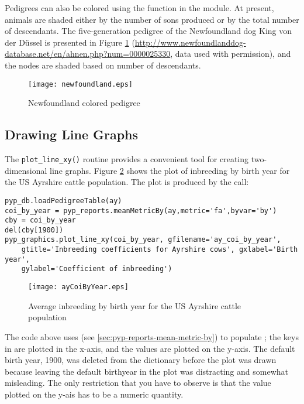 Pedigrees can also be colored using the  function in the  module. At present, animals are shaded either by the number of sons produced or by the total number of descendants. The five-generation pedigree of the Newfoundland dog King von der D\"{u}ssel is presented in Figure \ref{fig:newfoundland-colored-pedigree} (\url{http://www.newfoundlanddog-database.net/en/ahnen.php?num=0000025330}, data used with permission), and the nodes are shaded based on number of descendants.
\begin{figure}
  \begin{center}
    \texttt{[image: newfoundland.eps]}
    \caption{Newfoundland colored pedigree}
    \label{fig:newfoundland-colored-pedigree}
  \end{center}
\end{figure}

\subsection{Drawing Line Graphs}\label{sec:graphics-drawing-line-graphs}
The \texttt{plot\_line\_xy()} routine provides a convenient tool for creating two-dimensional line graphs.  Figure \ref{fig:ayrshire-coi-graph} shows the plot of inbreeding by birth year for the US Ayrshire cattle population.  The plot is produced by the call:
\begin{verbatim}
pyp_db.loadPedigreeTable(ay)
coi_by_year = pyp_reports.meanMetricBy(ay,metric='fa',byvar='by')
cby = coi_by_year
del(cby[1900])
pyp_graphics.plot_line_xy(coi_by_year, gfilename='ay_coi_by_year',
    gtitle='Inbreeding coefficients for Ayrshire cows', gxlabel='Birth year',
    gylabel='Coefficient of inbreeding')
\end{verbatim}
\begin{figure}
  \begin{center}
    \texttt{[image: ayCoiByYear.eps]}
    \caption{Average inbreeding by birth year for the US Ayrshire cattle population}
    \label{fig:ayrshire-coi-graph}
  \end{center}
\end{figure}
The code above uses  (see \ref{sec:pyp-reports-mean-metric-by}) to populate ; the keys in  are plotted in the x-axis, and the values are plotted on the y-axis.  The default birth year, 1900, was deleted from the dictionary before the plot was drawn because leaving the default birthyear in the plot was distracting and somewhat misleading.  The only restriction that you have to observe is that the value plotted on the y-ais has to be a numeric quantity.

